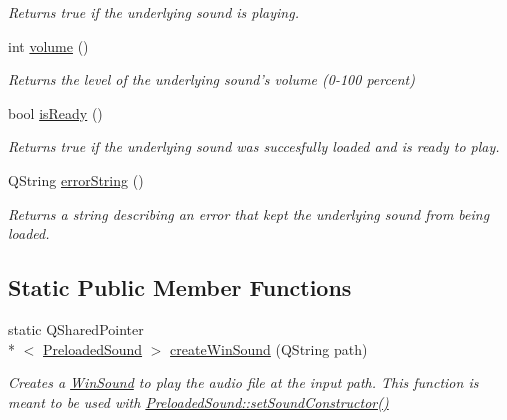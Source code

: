 \begin{DoxyCompactItemize}
\begin{DoxyCompactList}\small\item\em Returns true if the underlying sound is playing. \end{DoxyCompactList}\item 
int \hyperlink{class_picto_1_1_win_sound_ae6791975508598ea0a237a2baf1b4836}{volume} ()
\begin{DoxyCompactList}\small\item\em Returns the level of the underlying sound's volume (0-\/100 percent) \end{DoxyCompactList}\item 
\hypertarget{class_picto_1_1_win_sound_af20b657cf88d9df112473d22f925b868}{bool \hyperlink{class_picto_1_1_win_sound_af20b657cf88d9df112473d22f925b868}{is\-Ready} ()}\label{class_picto_1_1_win_sound_af20b657cf88d9df112473d22f925b868}

\begin{DoxyCompactList}\small\item\em Returns true if the underlying sound was succesfully loaded and is ready to play. \end{DoxyCompactList}\item 
Q\-String \hyperlink{class_picto_1_1_win_sound_a8af6f5b842c004d350ff77247d931c14}{error\-String} ()
\begin{DoxyCompactList}\small\item\em Returns a string describing an error that kept the underlying sound from being loaded. \end{DoxyCompactList}\end{DoxyCompactItemize}
\subsection*{Static Public Member Functions}
\begin{DoxyCompactItemize}
\item 
\hypertarget{class_picto_1_1_win_sound_af0d832621f432aa8b0259320ff8ec844}{static Q\-Shared\-Pointer\\*
$<$ \hyperlink{class_picto_1_1_preloaded_sound}{Preloaded\-Sound} $>$ \hyperlink{class_picto_1_1_win_sound_af0d832621f432aa8b0259320ff8ec844}{create\-Win\-Sound} (Q\-String path)}\label{class_picto_1_1_win_sound_af0d832621f432aa8b0259320ff8ec844}

\begin{DoxyCompactList}\small\item\em Creates a \hyperlink{class_picto_1_1_win_sound}{Win\-Sound} to play the audio file at the input path.  This function is meant to be used with \hyperlink{class_picto_1_1_preloaded_sound_a52385d8c6fb8563fb8c82455f9677acc}{Preloaded\-Sound\-::set\-Sound\-Constructor()} \end{DoxyCompactList}\end{DoxyCompactItemize}


